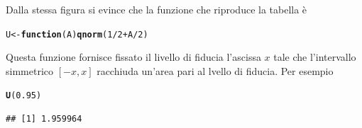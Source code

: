 \documentclass[onecolumn,12pt]{book}\usepackage[]{graphicx}\usepackage[]{color}
\makeatletter
\newcommand{\hlnum}[1]{\textcolor[rgb]{0.686,0.059,0.569}{#1}}%
\newcommand{\hlopt}[1]{\textcolor[rgb]{0,0,0}{#1}}%
\newcommand{\hlstd}[1]{\textcolor[rgb]{0.345,0.345,0.345}{#1}}%
\newcommand{\hlkwa}[1]{\textcolor[rgb]{0.161,0.373,0.58}{\textbf{#1}}}%
\newcommand{\hlkwb}[1]{\textcolor[rgb]{0.69,0.353,0.396}{#1}}%
\newcommand{\hlkwc}[1]{\textcolor[rgb]{0.333,0.667,0.333}{#1}}%
\newcommand{\hlkwd}[1]{\textcolor[rgb]{0.737,0.353,0.396}{\textbf{#1}}}%
\newenvironment{kframe}{%
 \def\at@end@of@kframe{}%
 \ifinner\ifhmode%
  \def\at@end@of@kframe{\end{minipage}}%
  \begin{minipage}{\columnwidth}%
 \fi\fi%
 \def\FrameCommand##1{\hskip\@totalleftmargin \hskip-\fboxsep
 \colorbox{shadecolor}{##1}\hskip-\fboxsep
     \hskip-\linewidth \hskip-\@totalleftmargin \hskip\columnwidth}%
 \MakeFramed {\advance\hsize-\width
   \@totalleftmargin\z@ \linewidth\hsize
   \@setminipage}}%
 {\par\unskip\endMakeFramed%
 \at@end@of@kframe}
\newenvironment{knitrout}{}{} %
\makeatother
\begin{document}
Dalla stessa figura  si evince che la funzione che riproduce la tabella è
\begin{knitrout}
\color{fgcolor}\begin{kframe}
\begin{alltt}
\hlstd{U} \hlkwb{<-}\hlkwa{function} \hlstd{(}\hlkwc{A}\hlstd{)} \hlkwd{qnorm} \hlstd{(}\hlnum{1}\hlopt{/}\hlnum{2} \hlopt{+} \hlstd{A}\hlopt{/}\hlnum{2}\hlstd{)}
\end{alltt}
\end{kframe}
\end{knitrout}
Questa funzione fornisce fissato il livello di fiducia l'ascissa $x$  tale che l'intervallo simmetrico $[-x,x]$ racchiuda un'area pari al lvello di fiducia. Per esempio
\begin{knitrout}
\color{fgcolor}\begin{kframe}
\begin{alltt}
\hlkwd{U}\hlstd{(}\hlnum{0.95}\hlstd{)}
\end{alltt}
\begin{verbatim}
## [1] 1.959964
\end{verbatim}
\end{kframe}
\end{knitrout}
\end{document}
